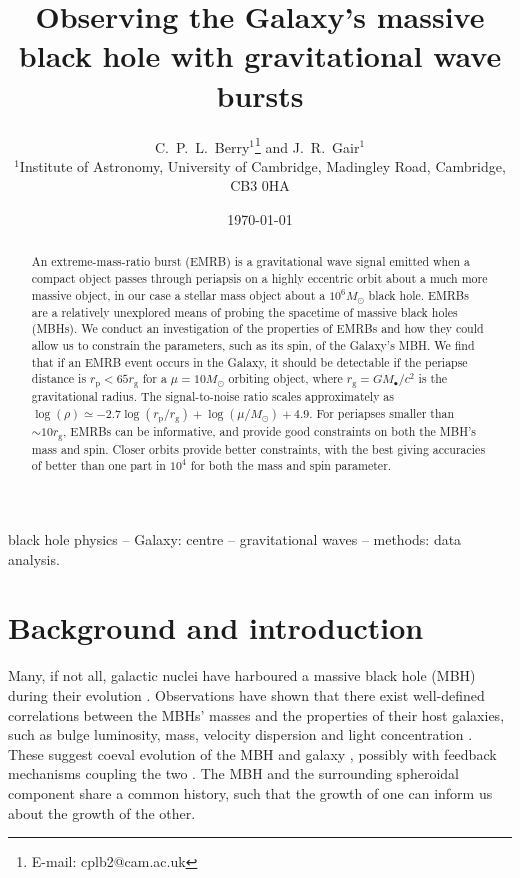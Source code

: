 \documentclass[useAMS,usedcolumn,usegraphicx,usenatbib]{mn2e}
\title[Observing the Galaxy's MBH with GW bursts]{Observing the Galaxy's massive black hole with gravitational wave bursts}
\author[C.\ P.\ L.\ Berry and J.\ R.\ Gair]{C.\ P.\ L.\ Berry$^{1}$\thanks{E-mail: cplb2@cam.ac.uk}  and J.\ R.\ Gair$^{1}$\\
$^{1}$Institute of Astronomy, University of Cambridge, Madingley Road, Cambridge, CB3 0HA}
\newcommand{\sub}[1]{\ensuremath{_\mathrm{#1}}}
\begin{document}
\date{\today}

\pagerange{\pageref{firstpage}--\pageref{lastpage}} 

\maketitle

\label{firstpage}

\begin{abstract}
An extreme-mass-ratio burst (EMRB) is a gravitational wave signal emitted when a compact object passes through periapsis on a highly eccentric orbit about a much more massive object, in our case a stellar mass object about a $10^6 M_\odot$ black hole. EMRBs are a relatively unexplored means of probing the spacetime of massive black holes (MBHs). We conduct an investigation of the properties of EMRBs and how they could allow us to constrain the parameters, such as its spin, of the Galaxy's MBH. We find that if an EMRB event occurs in the Galaxy, it should be detectable if the periapse distance is $r\sub{p} < 65 r\sub{g}$ for a $\mu = 10 M_\odot$ orbiting object, where $r\sub{g} = GM_\bullet/c^2$ is the gravitational radius. The signal-to-noise ratio scales approximately as $\log(\rho) \simeq -2.7\log(r\sub{p}/r\sub{g}) + \log(\mu/M_\odot) + 4.9$. For periapses smaller than $\sim 10 r\sub{g}$, EMRBs can be informative, and provide good constraints on both the MBH's mass and spin. Closer orbits provide better constraints, with the best giving accuracies of better than one part in $10^4$ for both the mass and spin parameter.
\end{abstract}

\begin{keywords}
black hole physics -- Galaxy: centre -- gravitational waves -- methods: data analysis.
\end{keywords}

\section{Background and introduction}\label{sec:Intro}

Many, if not all, galactic nuclei have harboured a massive black hole (MBH) during their evolution \citep{Lynden-Bell1971, Soltan1982, Rees1984}. Observations have shown that there exist well-defined correlations between the MBHs' masses and the properties of their host galaxies, such as bulge luminosity, mass, velocity dispersion and light concentration \citep{Kormendy1995, Magorrian1998, Ferrarese2000, Gebhardt2000, Graham2001, Tremaine2002, Marconi2003, Haring2004, Graham2007, Graham2011}. These suggest coeval evolution of the MBH and galaxy \citep{Peng2007, Jahnke2011}, possibly with feedback mechanisms coupling the two \citep{Haiman2004, Volonteri2009}. The MBH and the surrounding spheroidal component share a common history, such that the growth of one can inform us about the growth of the other.
\end{document}
